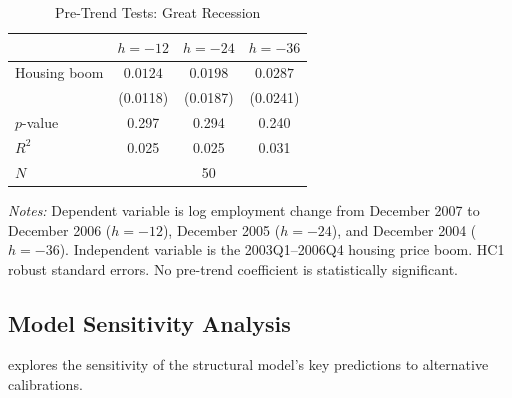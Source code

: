 \documentclass[12pt]{article}
\begin{document}
\begin{table}[H]
\centering
\caption{Pre-Trend Tests: Great Recession}
\label{tab:app_pretrends}
\begin{threeparttable}
\small
\begin{tabular}{lccc}
\toprule
& $h=-12$ & $h=-24$ & $h=-36$ \\
\midrule
Housing boom & $0.0124$ & $0.0198$ & $0.0287$ \\
             & (0.0118) & (0.0187) & (0.0241) \\
$p$-value    & 0.297 & 0.294 & 0.240 \\
$R^2$        & 0.025 & 0.025 & 0.031 \\
\midrule
$N$ & \multicolumn{3}{c}{50} \\
\bottomrule
\end{tabular}
\begin{tablenotes}[flushleft]
\small
\item \textit{Notes:} Dependent variable is log employment change from December 2007 to December 2006 ($h = -12$), December 2005 ($h = -24$), and December 2004 ($h = -36$). Independent variable is the 2003Q1--2006Q4 housing price boom. HC1 robust standard errors. No pre-trend coefficient is statistically significant.
\end{tablenotes}
\end{threeparttable}
\end{table}

\subsection{Model Sensitivity Analysis}

 explores the sensitivity of the structural model's key predictions to alternative calibrations.
\end{document}
